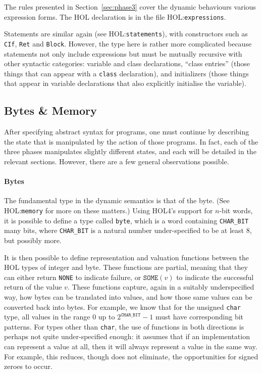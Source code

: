 \documentclass[11pt]{article}
\newcommand{\HOLfile}[1]{HOL:\texttt{#1}}
\begin{document}
The rules presented in Section~\ref{sec:phase3} cover the dynamic
behaviours various expression forms.  The HOL declaration is in the
file \HOLfile{expressions}.

Statements are similar again (see \HOLfile{statements}), with
constructors such as \texttt{CIf}, \texttt{Ret} and \texttt{Block}.
However, the type here is rather more complicated because statements
not only include expressions but must be mutually recursive with other
syntactic categories: variable and class declarations, ``class
entries'' (those things that can appear with a \texttt{class}
declaration), and initializers (those things that appear in variable
declarations that also explicitly initialise the variable).

\subsection{Bytes \& Memory}
\label{sec:bytes-memory-states}

After specifying abstract syntax for programs, one must continue by
describing the state that is manipulated by the action of those
programs.   In fact, each of the three phases manipulates slightly
different states, and each will be detailed in the relevant sections.
However, there are a few general observations possible.

\paragraph{Bytes} The fundamental type in the dynamic semantics is
that of the byte.  (See \HOLfile{memory} for more on these matters.)
Using HOL4's support for $n$-bit words, it is possible to define a
type called \texttt{byte}, which is a word containing
\texttt{CHAR_BIT} many bits, where \texttt{CHAR_BIT} is a natural
number under-specified to be at least 8, but possibly more.

It is then possible to define representation and valuation functions
between the HOL types of integer and byte.  These functions are
partial, meaning that they can either return \texttt{NONE} to indicate
failure, or $\texttt{SOME}(v)$ to indicate the successful return of
the value $v$.  These functions capture, again in a suitably
underspecified way, how bytes can be translated into values, and how
those same values can be converted back into bytes.  For example, we
know that for the unsigned \texttt{char} type, all values in the range
$0$ up to $2^{\texttt{CHAR_BIT}}-1$ must have corresponding bit
patterns.  For types other than \texttt{char}, the use of functions in
both directions is perhaps not quite under-specified enough: it
assumes that if an implementation can represent a value at all, then
it will always represent a value in the same way.  For example, this
reduces, though does not eliminate, the opportunities for signed
zeroes to occur.
\end{document}
